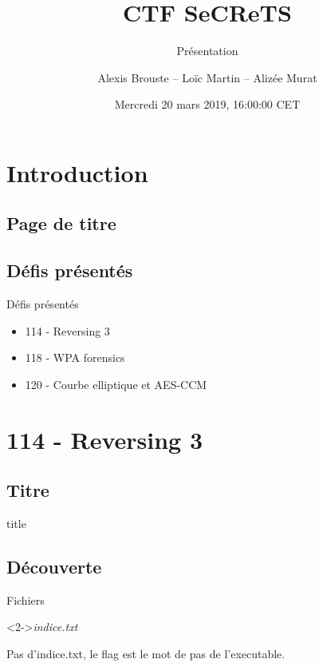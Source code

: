 \documentclass[10pt,sans,usenames,dvipsnames,french,compress]{beamer}
\title{CTF SeCReTS}
\subtitle{Présentation}
\author{Alexis Brouste -- Loïc Martin -- Alizée Murat}
\date{Mercredi 20 mars 2019, 16:00:00 CET}
\institute[UVSQ]{UVSQ}
\begin{document}
\section{Introduction}
\subsection{Page de titre}
\begin{frame}[plain]
	\titlepage
\end{frame}

\subsection{Défis présentés}
\begin{frame}{Défis présentés}
	\begin{itemize}
		\item 114 - Reversing 3
		\item 118 - WPA forensics
		\item 120 - Courbe elliptique et AES-CCM
	\end{itemize}
\end{frame}

\section{114 - Reversing 3}
\subsection{Titre}
\begin{frame}
	\begin{beamercolorbox}[sep=8pt,center]{title}
	\end{beamercolorbox}
\end{frame}

\subsection{Découverte}
\begin{frame}
	\begin{block}{Fichiers}
		\begin{small}
		\end{small}
	\end{block}

	\begin{block}<2->{\textit{indice.txt}}
		\begin{itshape}	
			\begin{small}
			Pas d'indice.txt, le flag est le mot de pas de l'executable.
			\end{small}
		\end{itshape}
	\end{block}
\end{frame}
\end{document}

